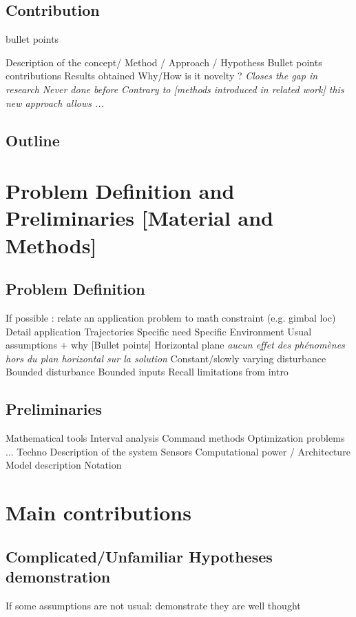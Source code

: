 \documentclass[twocolumn]{article}
\begin{document}
\subsection{Contribution}
bullet points
\begin{outline}
\1 Description of the concept/ Method / Approach / Hypothess
\1 Bullet points contributions
\1 Results obtained
\1 Why/How is it novelty ? 
\2 \emph{Closes the gap in research}
\2 \emph{Never done before}
\2 \emph{Contrary to \emph{[methods introduced in related work]} this new approach allows ...}
\end{outline}

\subsection{Outline}

\section{Problem Definition and Preliminaries [Material and Methods]}
\subsection{Problem Definition}
\begin{outline}
\1 If possible : relate an application problem to math constraint (e.g. gimbal loc)
\1 Detail application
\2 Trajectories
\2 Specific need
\2 Specific Environment
\1 Usual assumptions + why [Bullet points]
\2 Horizontal plane \emph{aucun effet des phénomènes hors du plan horizontal sur la solution}
\2 Constant/slowly varying disturbance
\2 Bounded disturbance
\2 Bounded inputs
\2 Recall limitations from intro
\end{outline}

\subsection{Preliminaries}
\begin{outline}
\1 Mathematical tools 
\2 Interval analysis
\2 Command methods
\2 Optimization problems ...
\1 Techno
\2 Description of the system
\2 Sensors
\2 Computational power / Architecture
\1 Model description
\1 Notation
\end{outline}

\section{Main contributions}
\subsection{Complicated/Unfamiliar Hypotheses demonstration}
\begin{outline}
\1 If some assumptions are not usual: demonstrate they are well thought
\end{outline}
\end{document}
